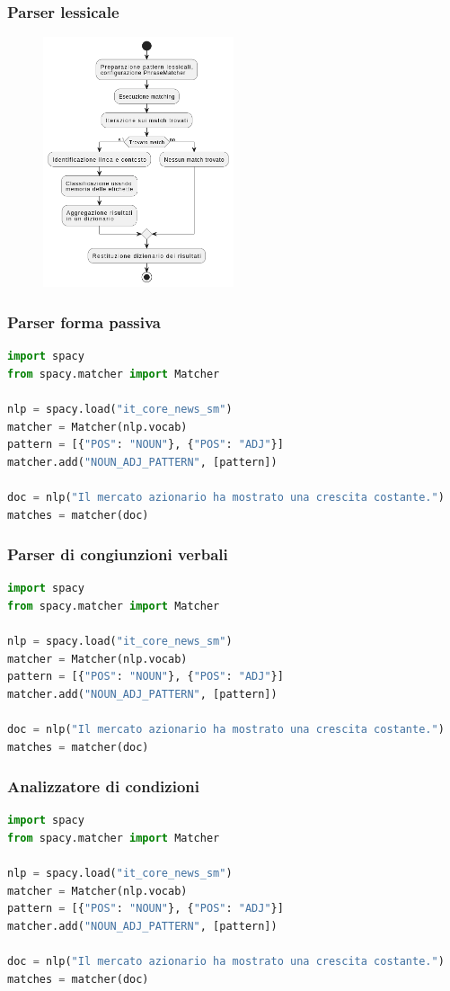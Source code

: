 \documentclass{beamer}
\begin{document}
\begin{frame}
\frametitle{Parser lessicale}

\begin{figure}
\includegraphics[width=0.5\textwidth]{lexical_analyser.png}
\end{figure}
\end{frame}


\begin{frame}[fragile]
\frametitle{Parser forma passiva}

\begin{lstlisting}[language=Python]
import spacy
from spacy.matcher import Matcher

nlp = spacy.load("it_core_news_sm")
matcher = Matcher(nlp.vocab)
pattern = [{"POS": "NOUN"}, {"POS": "ADJ"}]
matcher.add("NOUN_ADJ_PATTERN", [pattern])

doc = nlp("Il mercato azionario ha mostrato una crescita costante.")
matches = matcher(doc)
\end{lstlisting}
\end{frame}


\begin{frame}[fragile]
\frametitle{Parser di congiunzioni verbali}

\begin{lstlisting}[language=Python]
import spacy
from spacy.matcher import Matcher

nlp = spacy.load("it_core_news_sm")
matcher = Matcher(nlp.vocab)
pattern = [{"POS": "NOUN"}, {"POS": "ADJ"}]
matcher.add("NOUN_ADJ_PATTERN", [pattern])

doc = nlp("Il mercato azionario ha mostrato una crescita costante.")
matches = matcher(doc)
\end{lstlisting}
\end{frame}


\begin{frame}[fragile]
\frametitle{Analizzatore di condizioni}

\begin{lstlisting}[language=Python]
import spacy
from spacy.matcher import Matcher

nlp = spacy.load("it_core_news_sm")
matcher = Matcher(nlp.vocab)
pattern = [{"POS": "NOUN"}, {"POS": "ADJ"}]
matcher.add("NOUN_ADJ_PATTERN", [pattern])

doc = nlp("Il mercato azionario ha mostrato una crescita costante.")
matches = matcher(doc)
\end{lstlisting}
\end{frame}
\end{document}

